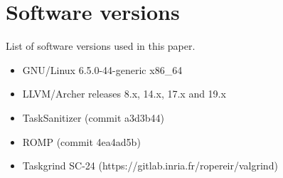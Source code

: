 \newpage

\appendix
\label{sec:appendix}

\section{Software versions}
List of software versions used in this paper.
\begin{itemize}
    \item   GNU/Linux 6.5.0-44-generic x86\_64
    \item   LLVM/Archer releases 8.x, 14.x, 17.x and 19.x
    \item 	TaskSanitizer (commit a3d3b44)
    \item 	ROMP (commit 4ea4ad5b)
    \item   Taskgrind SC-24 (https://gitlab.inria.fr/ropereir/valgrind)
\end{itemize}

